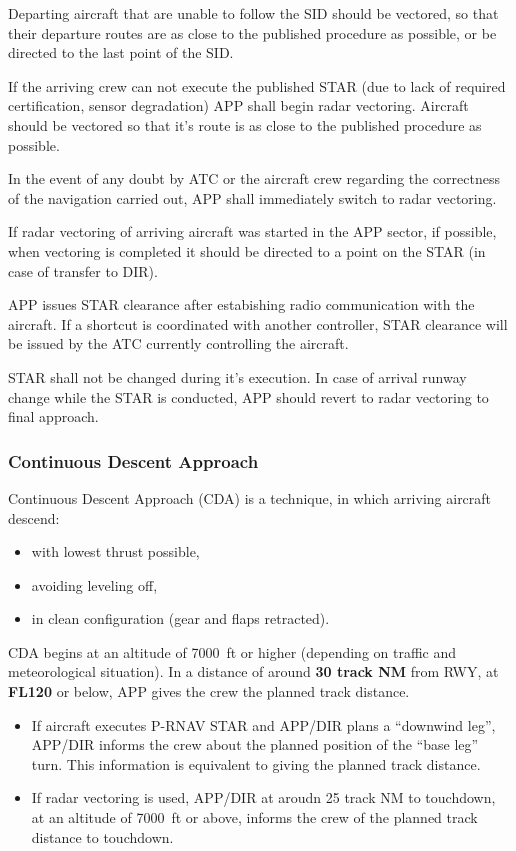 Departing aircraft that are unable to follow the SID should be vectored, so that
their departure routes are as close to the published procedure as possible, or
be directed to the last point of the SID.\@

If the arriving crew can not execute the published STAR (due to lack of required
certification, sensor degradation) APP shall begin radar vectoring. Aircraft
should be vectored so that it's route is as close to the published procedure as
possible.

In the event of any doubt by ATC or the aircraft crew regarding the correctness
of the navigation carried out, APP shall immediately switch to radar vectoring.

If radar vectoring of arriving aircraft was started in the APP sector, if
possible, when vectoring is completed it should be directed to a point on the
STAR (in case of transfer to DIR).

APP issues STAR clearance after estabishing radio communication with the
aircraft. If a shortcut is coordinated with another controller, STAR clearance
will be issued by the ATC currently controlling the aircraft.

STAR shall not be changed during it's execution. In case of arrival runway
change while the STAR is conducted, APP should revert to radar vectoring to
final approach.

\subsubsection{Continuous Descent Approach}

Continuous Descent Approach (CDA) is a technique, in which arriving aircraft
descend:

\begin{itemize}
\item with lowest thrust possible,
\item avoiding leveling off,
\item in clean configuration (gear and flaps retracted).
\end{itemize}

CDA begins at an altitude of 7000~ft or higher (depending on traffic and
meteorological situation). In a distance of around \textbf{30 track NM} from
RWY, at \textbf{FL120} or below, APP gives the crew the planned track distance.

\begin{itemize}
\item If aircraft executes P-RNAV STAR and APP/DIR plans a ``downwind leg'',
APP/DIR informs the crew about the planned position of the ``base leg'' turn.
This information is equivalent to giving the planned track distance.
\item If radar vectoring is used, APP/DIR at aroudn 25 track NM to touchdown, at
an altitude of 7000~ft or above, informs the crew of the planned track distance
to touchdown.
\end{itemize}

